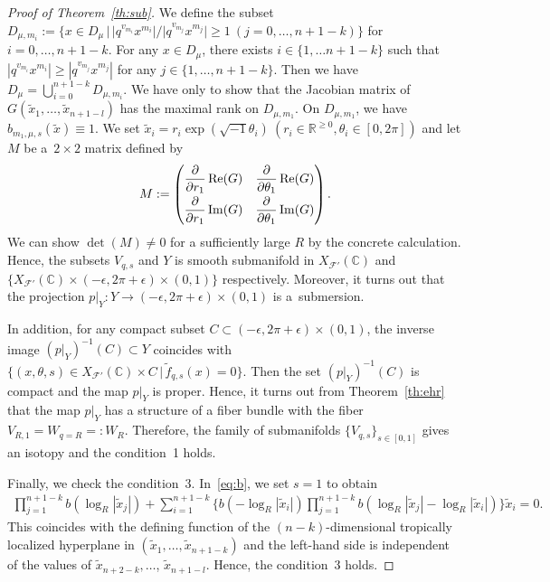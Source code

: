 \documentclass[pdftex]{sigma}
\numberwithin{equation}{section}
\begin{document}
\begin{proof}[Proof of Theorem~\ref{th:sub}]
We def\/ine the subset $D_{\mu,m_i}:=\{ x \in D_{\mu} \,|\, |q^{v_{m_i}}x^{m_i}|/|q^{v_{m_j}}x^{m_j}| \geq1\ (j=0, \dots, n+1-k) \}$ for $i=0, \dots, n+1-k$. For any $x \in D_\mu$, there exists $i \in \{1, \dots n+1-k\}$ such that $|q^{v_{m_i}}x^{m_i}| \geq |q^{v_{m_j}}x^{m_j}|$ for any $j \in \{1, \dots, n+1-k\}$.
Then we have $D_{\mu} = \bigcup_{i=0}^{n+1-k} D_{\mu,m_i}$. We have only to show that the Jacobian matrix of $G(\tilde{x}_1, \dots, \tilde{x}_{n+1-l})$ has the maximal rank on $D_{\mu,{m_1}}$. On $D_{\mu,{m_1}}$, we have $b_{m_1,\mu,s}(\tilde{x}) \equiv 1$. We set $\tilde{x}_i=r_i\exp(\sqrt{-1} \theta_i)\ (r_i \in {\mathbb R}^{\geq0}, \theta_i \in [0,2\pi])$ and let $M$ be a~$2 \times 2$ matrix def\/ined by
\begin{gather*}
M:=\begin{pmatrix}
\dfrac{\partial}{\partial r_{1}} \operatorname{Re}(G) &\dfrac{\partial}{\partial \theta_{1}} \operatorname{Re}(G)\vspace{1mm}\\
\dfrac{\partial}{\partial r_{1}} \operatorname{Im}(G) &\dfrac{\partial}{\partial \theta_{1}} \operatorname{Im}(G)
\end{pmatrix}.
\end{gather*}
We can show $\det(M) \neq 0$ for a suf\/f\/iciently large $R$ by the concrete calculation. Hence, the subsets $V_{q,s}$ and $Y$ is smooth submanifold in $X_{{\mathcal F}'}({\mathbb C})$ and $\{X_{{\mathcal F}'}({\mathbb C}) \times (-\epsilon, 2\pi+\epsilon) \times (0,1)\}$ respectively. Moreover, it turns out that the projection $p|_Y \colon Y \to (-\epsilon, 2\pi+\epsilon) \times (0,1)$ is a~sub\-mersion.

In addition, for any compact subset $C \subset (-\epsilon, 2\pi+\epsilon) \times (0,1)$, the inverse image $(p|_Y)^{-1}(C) \subset Y$ coincides with $\{(x, \theta, s) \in X_{{\mathcal F}'}({\mathbb C}) \times C \,|\, \tilde{f}_{q,s}(x)=0\}$. Then the set $(p|_Y)^{-1}(C)$ is compact and the map $p|_Y$ is proper.
Hence, it turns out from Theorem~\ref{th:ehr} that the map $p|_Y$ has a structure of a f\/iber bundle with the f\/iber $V_{R,1}=W_{q=R}=:W_R$. Therefore, the family of submanifolds $\{V_{q,s}\}_{s \in [0,1]}$ gives an isotopy and the condition~1 holds.

Finally, we check the condition~3. In~\eqref{eq:b}, we set $s=1$ to obtain
\begin{gather*}
\prod_{j=1}^{n+1-k}b(\log_R|\tilde{x}_j|)+\sum_{i=1}^{n+1-k}\bigg\{b(-\log_R|\tilde{x}_i|) \prod_{j=1}^{n+1-k}b(\log_R|\tilde{x}_j|-\log_R|\tilde{x}_i|) \bigg\}\tilde{x}_i=0.
\end{gather*}
This coincides with the def\/ining function of the $(n-k)$-dimensional tropically localized hyperplane in $(\tilde{x}_1, \dots, \tilde{x}_{n+1-k})$ and the left-hand side is independent of the values of $\tilde{x}_{n+2-k}, \dots$, $\tilde{x}_{n+1-l}$.
Hence, the condition~3 holds.
\end{proof}
\end{document}
